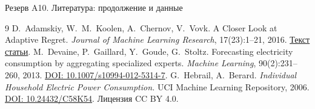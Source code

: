 \documentclass[11pt,aspectratio=169]{beamer}
\begin{document}
\begin{frame}{Резерв A10. Литература: продолжение и данные}
  \small
  \begin{thebibliography}{9}
      D.~Adamskiy, W.~M.~Koolen, A.~Chernov, V.~Vovk.
      A Closer Look at Adaptive Regret.
      \emph{Journal of Machine Learning Research}, 17(23):1--21, 2016.
      \href{https://www.jmlr.org/papers/v17/13-533.html}{Текст статьи}.
      \medskip
      M.~Devaine, P.~Gaillard, Y.~Goude, G.~Stoltz.
      Forecasting electricity consumption by aggregating specialized experts.
      \emph{Machine Learning}, 90(2):231--260, 2013.
      \href{https://doi.org/10.1007/s10994-012-5314-7}{DOI: 10.1007/s10994-012-5314-7}.
      \medskip
      G.~Hebrail, A.~Berard.
      \emph{Individual Household Electric Power Consumption.}
      UCI Machine Learning Repository, 2006.
      \href{https://doi.org/10.24432/C58K54}{DOI: 10.24432/C58K54}.
      Лицензия CC BY 4.0.
  \end{thebibliography}
\end{frame}
\end{document}
